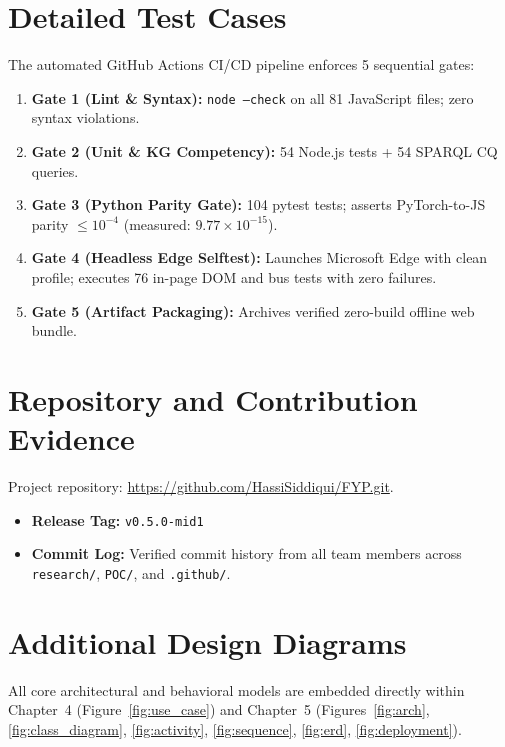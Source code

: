 \documentclass[12pt,a4paper]{report}
\begin{document}
\chapter{Detailed Test Cases}
\label{app:test_cases}
The automated GitHub Actions CI/CD pipeline enforces 5 sequential gates:
\begin{enumerate}[leftmargin=1.5em]
    \item \textbf{Gate 1 (Lint \& Syntax):} \texttt{node --check} on all 81 JavaScript files; zero syntax violations.
    \item \textbf{Gate 2 (Unit \& KG Competency):} 54 Node.js tests + 54 SPARQL CQ queries.
    \item \textbf{Gate 3 (Python Parity Gate):} 104 pytest tests; asserts PyTorch-to-JS parity $\le 10^{-4}$ (measured: $9.77 \times 10^{-15}$).
    \item \textbf{Gate 4 (Headless Edge Selftest):} Launches Microsoft Edge with clean profile; executes 76 in-page DOM and bus tests with zero failures.
    \item \textbf{Gate 5 (Artifact Packaging):} Archives verified zero-build offline web bundle.
\end{enumerate}

\chapter{Repository and Contribution Evidence}
\label{app:repo_evidence}
Project repository: \url{https://github.com/HassiSiddiqui/FYP.git}.
\begin{itemize}[leftmargin=1.5em]
    \item \textbf{Release Tag:} \texttt{v0.5.0-mid1}
    \item \textbf{Commit Log:} Verified commit history from all team members across \texttt{research/}, \texttt{POC/}, and \texttt{.github/}.
\end{itemize}

\chapter{Additional Design Diagrams}
\label{app:diagrams}
All core architectural and behavioral models are embedded directly within Chapter~4 (Figure~\ref{fig:use_case}) and Chapter~5 (Figures~\ref{fig:arch}, \ref{fig:class_diagram}, \ref{fig:activity}, \ref{fig:sequence}, \ref{fig:erd}, \ref{fig:deployment}).
\end{document}
